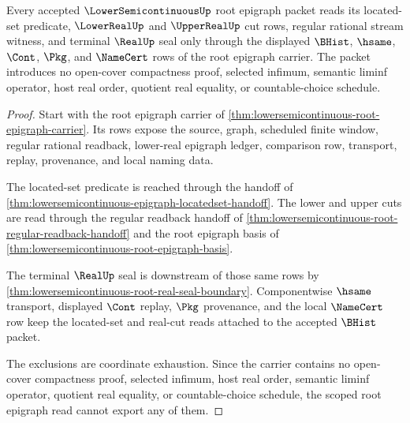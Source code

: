 \begin{theorem}
\label{thm:lower-semicontinuous-root-epigraph-carrier-scope}
Every accepted $\LowerSemicontinuousUp$ root epigraph packet reads its located-set predicate, $\LowerRealUp$ and $\UpperRealUp$ cut rows, regular rational stream witness, and terminal $\RealUp$ seal only through the displayed $\BHist$, $\hsame$, $\Cont$, $\Pkg$, and $\NameCert$ rows of the root epigraph carrier. The packet introduces no open-cover compactness proof, selected infimum, semantic liminf operator, host real order, quotient real equality, or countable-choice schedule.
\end{theorem}
\begin{proof}
Start with the root epigraph carrier of \autoref{thm:lowersemicontinuous-root-epigraph-carrier}. Its rows expose the source, graph, scheduled finite window, regular rational readback, lower-real epigraph ledger, comparison row, transport, replay, provenance, and local naming data.

The located-set predicate is reached through the handoff of \autoref{thm:lowersemicontinuous-epigraph-locatedset-handoff}. The lower and upper cuts are read through the regular readback handoff of \autoref{thm:lowersemicontinuous-root-regular-readback-handoff} and the root epigraph basis of \autoref{thm:lowersemicontinuous-root-epigraph-basis}.

The terminal $\RealUp$ seal is downstream of those same rows by \autoref{thm:lowersemicontinuous-root-real-seal-boundary}. Componentwise $\hsame$ transport, displayed $\Cont$ replay, $\Pkg$ provenance, and the local $\NameCert$ row keep the located-set and real-cut reads attached to the accepted $\BHist$ packet.

The exclusions are coordinate exhaustion. Since the carrier contains no open-cover compactness proof, selected infimum, host real order, semantic liminf operator, quotient real equality, or countable-choice schedule, the scoped root epigraph read cannot export any of them.
\end{proof}

